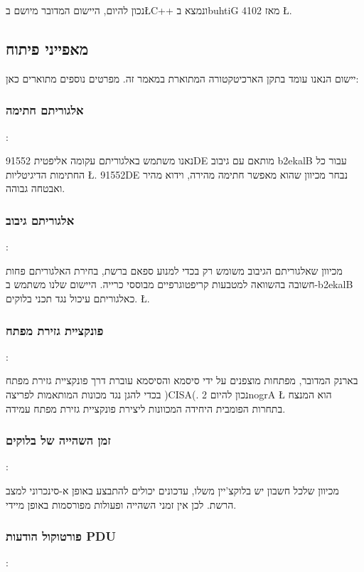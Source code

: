 נכון להיום, היישום המדובר מיושם ב\L{C++}
ונמצא בbuhtiG  מאז 4102
\L{\cite{LeMahieu_github}}.

\subsection{מאפייני פיתוח}
יישום הנאנו עומד בתקן הארכיטקטורה המתוארת במאמר זה. מפרטים נוספים מתוארים כאן:


\subsubsection{אלגוריתם חתימה}:

נאנו משתמש באלגוריתם עקומה אליפטית
91552DE
מותאם עם גיבוב
b2ekalB
עבור כל החתימות הדיגיטליות
\L{\cite{Bernstein_ED25519}}.
91552DE
נבחר מכיוון שהוא מאפשר חתימה מהירה, וידוא מהיר ואבטחה גבוהה.

\subsubsection{אלגוריתם גיבוב}:

מכיוון שאלגוריתם הגיבוב משומש רק בכדי למנוע ספאם ברשת, בחירת האלגוריתם פחות חשובה בהשוואה למטבעות קריפטוגרפיים מבוססי כרייה. היישום שלנו משתמש ב-b2ekalB
כאלגוריתם עיכול נגד תכני בלוקים.
\L{\cite{Aumasson_blake2}}.

\subsubsection{פונקציית גזירת מפתח} :

בארנק המדובר, מפתחות מוצפנים על ידי סיסמא והסיסמא עוברת דרך פונקציית גזירת מפתח בכדי להגן נגד מכונות המותאמות לפריצה
)CISA(.
נכון להיום 
2nogrA
\L{\cite{Biryukov_argon2}}
הוא המנצח בתחרות הפומבית היחידה המכוונות ליצירת פונקציית גזירת מפתח עמידה.

\subsubsection{זמן השהייה של בלוקים}:

מכיוון שלכל חשבון יש בלוקצ'יין משלו, עדכונים יכולים להתבצע באופן א-סינכרוני למצב הרשת. לכן אין זמני השהייה ופעולות מפורסמות באופן מיידי.

\subsubsection{פורטוקול הודעות PDU}:

